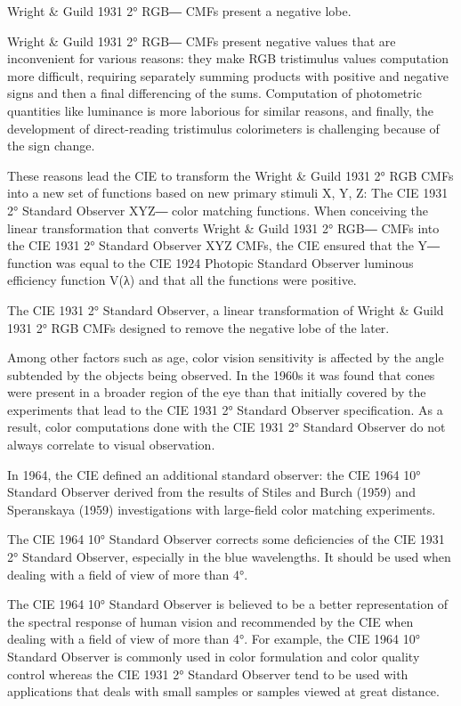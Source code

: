 Wright & Guild 1931 2° RGB― CMFs present a negative lobe.

Wright & Guild 1931 2° RGB― CMFs present negative values that are inconvenient for various reasons: they make RGB tristimulus values computation more difficult, requiring separately summing products with positive and negative signs and then a final differencing of the sums. Computation of photometric quantities like luminance is more laborious for similar reasons, and finally, the development of direct-reading tristimulus colorimeters is challenging because of the sign change.

These reasons lead the CIE to transform the Wright & Guild 1931 2° RGB CMFs into a new set of functions based on new primary stimuli X, Y, Z: The CIE 1931 2° Standard Observer XYZ― color matching functions. When conceiving the linear transformation that converts Wright & Guild 1931 2° RGB― CMFs into the CIE 1931 2° Standard Observer XYZ CMFs, the CIE ensured that the Y― function was equal to the CIE 1924 Photopic Standard Observer luminous efficiency function V(λ) and that all the functions were positive.
 

The CIE 1931 2° Standard Observer, a linear transformation of Wright & Guild 1931 2° RGB CMFs designed to remove the negative lobe of the later.
 
Among other factors such as age, color vision sensitivity is affected by the angle subtended by the objects being observed. In the 1960s it was found that cones were present in a broader region of the eye than that initially covered by the experiments that lead to the CIE 1931 2° Standard Observer specification. As a result, color computations done with the CIE 1931 2° Standard Observer do not always correlate to visual observation.

In 1964, the CIE defined an additional standard observer: the CIE 1964 10° Standard Observer derived from the results of Stiles and Burch (1959) and Speranskaya (1959) investigations with large-field color matching experiments.


The CIE 1964 10° Standard Observer corrects some deficiencies of the CIE 1931 2° Standard Observer, especially in the blue wavelengths. It should be used when dealing with a field of view of more than 4°.

The CIE 1964 10° Standard Observer is believed to be a better representation of the spectral response of human vision and recommended by the CIE when dealing with a field of view of more than 4°. For example, the CIE 1964 10° Standard Observer is commonly used in color formulation and color quality control whereas the CIE 1931 2° Standard Observer tend to be used with applications that deals with small samples or samples viewed at great distance.

